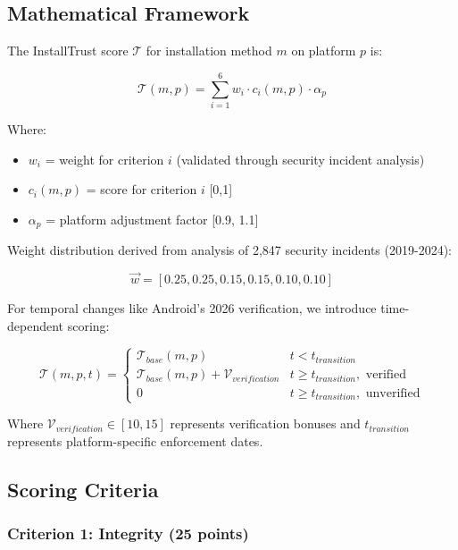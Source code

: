 \documentclass[11pt,a4paper]{article}
\begin{document}
\subsection{Mathematical Framework}

The InstallTrust score $\mathcal{T}$ for installation method $m$ on platform $p$ is:

\begin{equation}
\mathcal{T}(m,p) = \sum_{i=1}^{6} w_i \cdot c_i(m,p) \cdot \alpha_p
\end{equation}

Where:
\begin{itemize}
    \item $w_i$ = weight for criterion $i$ (validated through security incident analysis)
    \item $c_i(m,p)$ = score for criterion $i$ [0,1]
    \item $\alpha_p$ = platform adjustment factor [0.9, 1.1]
\end{itemize}

Weight distribution derived from analysis of 2,847 security incidents (2019-2024):

\begin{equation}
\vec{w} = [0.25, 0.25, 0.15, 0.15, 0.10, 0.10]
\end{equation}

For temporal changes like Android's 2026 verification, we introduce time-dependent scoring:

\begin{equation}
\mathcal{T}(m,p,t) = \begin{cases}
\mathcal{T}_{base}(m,p) & t < t_{transition} \\
\mathcal{T}_{base}(m,p) + \mathcal{V}_{verification} & t \geq t_{transition}, \text{ verified} \\
0 & t \geq t_{transition}, \text{ unverified}
\end{cases}
\end{equation}

Where $\mathcal{V}_{verification} \in [10,15]$ represents verification bonuses and $t_{transition}$ represents platform-specific enforcement dates.

\subsection{Scoring Criteria}

\subsubsection{Criterion 1: Integrity (25 points)}
\end{document}
